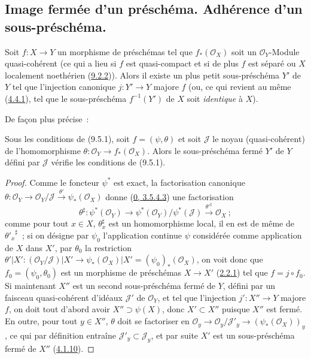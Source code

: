 \subsection{Image fermée d'un préschéma. Adhérence d'un sous-préschéma.}
\label{subsection:I.9.5-fr}

\begin{proposition}[9.5.1]
\label{I.9.5.1-fr}
Soit $f:X\to Y$ un morphisme de préschémas tel que $f_*(\mathscr{O}_X)$ soit
un $\mathscr{O}_Y$-Module quasi-cohérent (ce qui a lieu si $f$ est
quasi-compact et si de plus $f$ est séparé ou $X$ localement noethérien
(\hyperref[I.9.2.2-fr]{9.2.2})). Alors il existe un plus petit sous-préschéma
$Y'$ de $Y$ tel que l'injection canonique $j:Y'\to Y$ majore $f$ (ou, ce qui
revient au même (\hyperref[I.4.4.1-fr]{4.4.1}), tel que le sous-préschéma
$f^{-1}(Y')$ de $X$ soit \emph{identique} à $X$).
\end{proposition}

De façon plus précise~:

\begin{corollary}[9.5.2]
\label{I.9.5.2-fr}
Sous les conditions de (9.5.1), soit $f=(\psi,\theta)$ et soit $\mathscr{J}$
le noyau (quasi-cohérent) de l'homomorphisme
$\theta:\mathscr{O}_Y\to f_*(\mathscr{O}_X)$. Alors le sous-préschéma fermé
$Y'$ de $Y$ défini par $\mathscr{J}$ vérifie les conditions de (9.5.1).
\end{corollary}

\begin{proof}
Comme le foncteur $\psi^*$ est exact, la factorisation canonique
$\theta:\mathscr{O}_Y\to\mathscr{O}_Y/\mathscr{J}
\xrightarrow{\theta'}\psi_*(\mathscr{O}_X)$ donne
(\hyperref[0.3.5.4.3-fr]{0, 3.5.4.3}) une factorisation
\[
  \theta^\sharp:\psi^*(\mathscr{O}_Y)
  \to\psi^*(\mathscr{O}_Y)/\psi^*(\mathscr{J})
  \xrightarrow{{\theta'}^\sharp}\mathscr{O}_X~;
\]
comme pour tout $x\in X$, $\theta_x^\sharp$ est un homomorphisme local, il
en est de même de ${\theta'_x}^\sharp$~; si on désigne par $\psi_0$
l'application continue $\psi$ considérée comme application de $X$ dans
$X'$, par $\theta_0$ la restriction
$\theta'|X':(\mathscr{O}_Y/\mathscr{J})|X'
\to\psi_*(\mathscr{O}_X)|X'=(\psi_0)_*(\mathscr{O}_X)$, on voit donc que
$f_0=(\psi_0,\theta_0)$ est un morphisme de préschémas $X\to X'$
(\hyperref[I.2.2.1-fr]{2.2.1}) tel que $f=j\circ f_0$. Si maintenant $X''$
est un second sous-préschéma fermé de $Y$, défini par un faisceau
quasi-cohérent d'idéaux $\mathscr{J}'$ de $\mathscr{O}_Y$, et tel que
l'injection $j':X''\to Y$ majore $f$, on doit tout d'abord avoir
$X''\supset\psi(X)$, donc $X'\subset X''$ puisque $X''$ est fermé. En outre,
pour tout $y\in X''$, $\theta$ doit se factoriser en
$\mathscr{O}_y\to\mathscr{O}_y/\mathscr{J}'_y
\to(\psi_*(\mathscr{O}_X))_y$, ce qui par définition entraîne
$\mathscr{J}'_y\subset\mathscr{J}_y$, et par suite $X'$ est un
sous-préschéma fermé de $X''$ (\hyperref[I.4.1.10-fr]{4.1.10}).
\end{proof}

